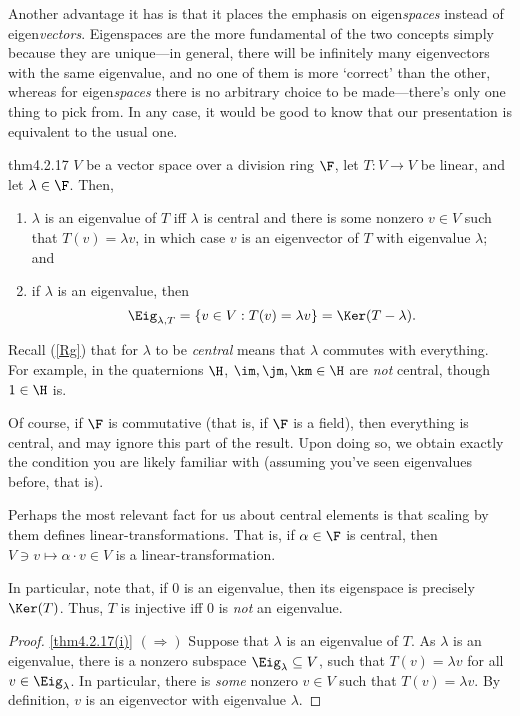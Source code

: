 Another advantage it has is that it places the emphasis on eigen\emph{spaces} instead of eigen\emph{vectors}.  Eigenspaces are the more fundamental of the two concepts simply because they are unique---in general, there will be infinitely many eigenvectors with the same eigenvalue, and no one of them is more `correct' than the other, whereas for eigen\emph{spaces} there is no arbitrary choice to be made---there's only one thing to pick from.  In any case, it would be good to know that our presentation is equivalent to the usual one.
\begin{thm}{}{thm4.2.17}
	$V$ be a vector space over a division ring $\F$, let $T\colon V\rightarrow V$ be linear, and let $\lambda \in \F$.  Then,
	\begin{enumerate}
		\item \label{thm4.2.17(i)}$\lambda$ is an eigenvalue of $T$ iff $\lambda$ is central and there is some nonzero $v\in V$ such that $T(v)=\lambda v$, in which case $v$ is an eigenvector of $T$ with eigenvalue $\lambda$; and
		\item \label{thm4.2.17(ii)}if $\lambda$ is an eigenvalue, then
		\begin{equation}
			\Eig _{\lambda ,T}=\{ v\in V:T(v)=\lambda v\} =\Ker (T-\lambda ).
		\end{equation}
	\end{enumerate}
	\begin{rmk}
		Recall (\cref{Rg}) that for $\lambda$ to be \emph{central} means that $\lambda$ commutes with everything.  For example, in the quaternions $\H$, $\im ,\jm ,\km \in \H$ are \emph{not} central, though $1\in \H$ is.
		
		Of course, if $\F$ is commutative (that is, if $\F$ is a field), then everything is central, and may ignore this part of the result.  Upon doing so, we obtain exactly the condition you are likely familiar with (assuming you've seen eigenvalues before, that is).
	\end{rmk}
	\begin{rmk}
		Perhaps the most relevant fact for us about central elements is that scaling by them defines linear-transformations.  That is, if $\alpha \in \F$ is central, then $V\ni v\mapsto \alpha \cdot v\in V$ is a linear-transformation.
	\end{rmk}
	\begin{rmk}
		In particular, note that, if $0$ is an eigenvalue, then its eigenspace is precisely $\Ker (T)$.  Thus, $T$ is injective iff $0$ is \emph{not} an eigenvalue.
	\end{rmk}
	\begin{proof}
		\cref{thm4.2.17(i)} $(\Rightarrow )$ Suppose that $\lambda$ is an eigenvalue of $T$.  As $\lambda$ is an eigenvalue, there is a nonzero subspace $\Eig _{\lambda}\subseteq V$, such that $T(v)=\lambda v$ for all $v\in \Eig _{\lambda}$.  In particular, there is \emph{some} nonzero $v\in V$ such that $T(v)=\lambda v$.  By definition, $v$ is an eigenvector with eigenvalue $\lambda$.
		

\end{proof}
\end{thm}
